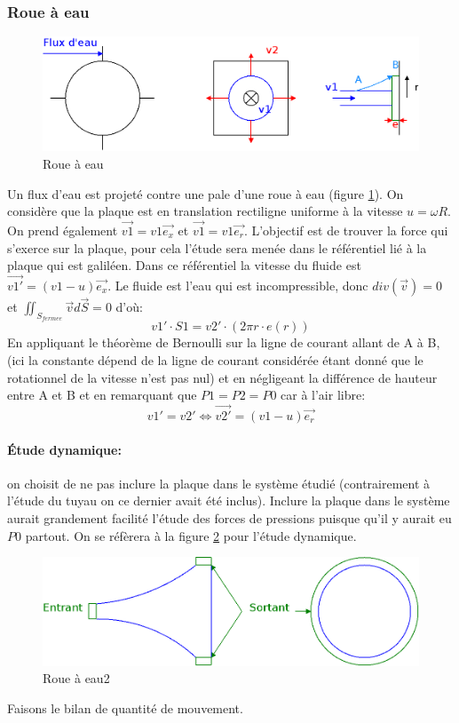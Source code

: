 \documentclass[10pt,a4paper]{article}
\begin{document}
\subsubsection{Roue à eau}
\begin{figure}
\centering
\includegraphics[scale=0.30]{roue}
\caption{Roue à eau}
\label{fig:roue}
\end{figure}
Un flux d'eau est projeté contre une pale d'une roue à eau (figure \ref{fig:roue}). On considère que la plaque est en translation rectiligne uniforme à la vitesse $u=\omega R$. On prend également $\vec{v1} = v1 \vec{e_{x}}$ et $\vec{v1} = v1 \vec{e_{r}}$. L'objectif est de trouver la force qui s'exerce sur la plaque, pour cela l'étude sera menée dans le référentiel lié à la plaque qui est galiléen. Dans ce référentiel la vitesse du fluide est $\vec{v1'} = (v1-u) \vec{e_{x}}$. Le fluide est l'eau qui est incompressible, donc $div(\vec{v}) = 0$ et $\iint_{S_{fermee}}\vec{v}d\vec{S} = 0$ d'où:
\[ v1'\cdot S1 = v2'\cdot (2\pi r \cdot e(r))\]
En appliquant le théorème de Bernoulli sur la ligne de courant allant de A à B, (ici la constante dépend de la ligne de courant considérée étant donné que le rotationnel de la vitesse n'est pas nul) et en négligeant la différence de hauteur entre A et B et en remarquant que $P1 = P2 = P0$ car à l'air libre:
\[v1' = v2' \iff \vec{v2'} = (v1 - u)\vec{e_{r}}\]

\paragraph{Étude dynamique:} on choisit de ne pas inclure la plaque dans le système étudié (contrairement à l'étude du tuyau on ce dernier avait été inclus). Inclure la plaque dans le système aurait grandement facilité l'étude des forces de pressions puisque qu'il y aurait eu $P0$ partout. On se réfèrera à la figure \ref{fig:roue2} pour l'étude dynamique.
\begin{figure}
\centering
\includegraphics[scale=0.30]{roue2}
\caption{Roue à eau2}
\label{fig:roue2}
\end{figure}
Faisons le bilan de quantité de mouvement.



\newpage


\end{document}
